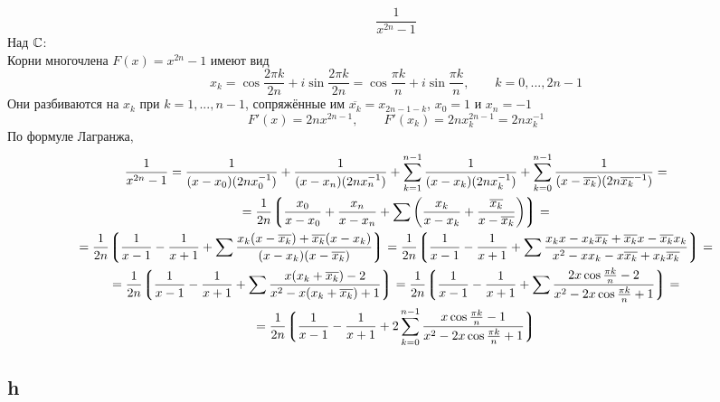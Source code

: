 $$ \frac1{x^{2n} - 1} $$
Над $ \mathbb{C} $: \\
Корни многочлена $ F(x) = x^{2n} - 1 $ имеют вид
$$ x_k = \cos \frac{2\pi k}{2n} + i \sin \frac{2\pi k}{2n} = \cos \frac{\pi k}n + i \sin \frac{\pi k}n, \qquad k = 0, ..., 2n - 1 $$
Они разбиваются на $ x_k $ при $ k = 1, ..., n - 1 $, сопряжённые им $ \overline{x_k} = x_{2n - 1 - k} $, $ x_0 = 1 $ и $ x_n = -1 $
$$ F'(x) = 2nx^{2n - 1}, \qquad F'(x_k) = 2nx_k^{2n - 1} = 2nx_k^{-1} $$
По формуле Лагранжа,
\begin{multline*}
    \frac1{x^{2n} - 1} = \frac1{(x - x_0)(2nx_0^{-1})} + \frac1{(x - x_n)(2nx_n^{-1})} + \sum_{k = 1}^{n - 1} \frac1{(x - x_k)(2nx_k^{-1})} + \sum_{k = 0}^{n - 1} \frac1{(x - \overline{x_k})(2n\overline{x_k}^{-1})} = \\
    = \frac1{2n} \bigg\lgroup \frac{x_0}{x - x_0} + \frac{x_n}{x - x_n} + \sum \bigg( \frac{x_k}{x - x_k} + \frac{\overline{x_k}}{x - \overline{x_k}} \bigg) \bigg\rgroup = \\
    = \frac1{2n} \bigg\lgroup \frac1{x - 1} - \frac1{x + 1} + \sum \frac{x_k(x - \overline{x_k}) + \overline{x_k}(x - x_k)}{(x - x_k)(x - \overline{x_k})} \bigg\rgroup = \frac1{2n} \bigg\lgroup \frac1{x - 1} - \frac1{x + 1} + \sum \frac{x_kx - x_k\overline{x_k} + \overline{x_k}x - \overline{x_k}x_k}{x^2 - xx_k - x\overline{x_k} + x_k\overline{x_k}} \bigg\rgroup = \\
    = \frac1{2n} \bigg\lgroup \frac1{x - 1} - \frac1{x + 1} + \sum \frac{x(x_k + \overline{x_k}) - 2}{x^2 - x(x_k + \overline{x_k}) + 1} \bigg\rgroup = \frac1{2n} \bigg\lgroup \frac1{x - 1} - \frac1{x + 1} + \sum \frac{2x\cos \frac{\pi k}n - 2}{x^2 - 2x\cos \frac{\pi k}n + 1} \bigg\rgroup = \\
    = \frac1{2n} \bigg\lgroup \frac1{x - 1} - \frac1{x + 1} + 2\sum_{k = 0}^{n - 1} \frac{x\cos\frac{\pi k}n - 1}{x^2 - 2x\cos \frac{\pi k}n + 1} \bigg\rgroup
\end{multline*}

\subsection{h}

